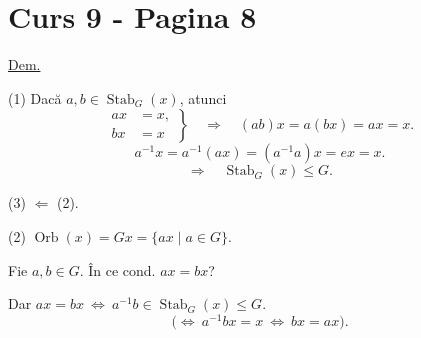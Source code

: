 
\section*{Curs 9 - Pagina 8}

\noindent\underline{Dem.}

\bigskip
\noindent (1) Dacă $a,b\in\operatorname{Stab}_G(x)$, atunci
\[
\left.\begin{aligned}
 ax&=x,\\
 bx&=x
\end{aligned}\right\}
\quad\Longrightarrow\quad (ab)x=a(bx)=ax=x.
\]
\[
a^{-1}x=a^{-1}(ax)=(a^{-1}a)x=ex=x.
\]
\[
\Longrightarrow\quad \operatorname{Stab}_G(x)\leq G.
\]

\bigskip
\noindent (3) $\Longleftarrow$ (2).

\bigskip
\noindent (2) $\operatorname{Orb}(x)=Gx=\{ax\mid a\in G\}$.

\bigskip
\noindent Fie $a,b\in G$. În ce cond. $ax=bx$?

\bigskip
\noindent Dar $ax=bx\ \Longleftrightarrow\ a^{-1}b\in\operatorname{Stab}_G(x)\leq G$.
\[
\big(\Longleftrightarrow\ a^{-1}bx=x\ \Longleftrightarrow\ bx=ax\big).
\]
